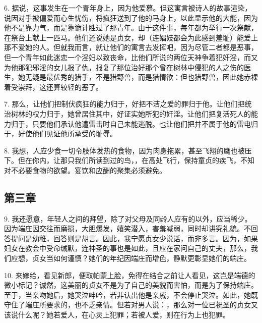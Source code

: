 6. 据说，这事发生在一个青年身上，因为他爱慕。但这寓言被诗人的故事渲染，说因对手被偏爱而心生忧伤，将疯狂送到了他的马身上，以此显示他的大能，因为他不是靠力气，而是靠诡计胜过了那青年。由于这件事，每年都为举行一次祭献，在祭台上献上一匹马。他们还说她是贞女，却（连娼妓都会为此感到羞耻）能爱上那不爱她的人。但就我而言，就让他们的寓言去发挥吧，因为尽管二者都是恶事，但一个青年如此迷恋一个淫妇以致丧命，比他们所说的两位天神争着犯奸淫，而又为他那犯邪淫的女儿报了仇，报复了那位治好那个曾在树林中侵犯的人之伤的医生，她无疑是最优秀的猎手，不是猎野兽，而是猎情欲：但也猎野兽，因此她赤裸着受崇拜，这还算较轻的恶了。\par

7. 那么，让他们把制伏疯狂的能力归于，好把不洁之爱的罪归于他。让他们把统治树林的权力归于，她曾居住其中，好证实她所犯的奸淫。让他们把复活死人的能力归于，只要他们承认他遭雷击时自己未能逃脱。也让他们把并不属于他的雷电归于，好使他们见证他所承受的耻辱。\par

8. 我想，人应少食一切令肢体发热的食物，因为肉身拖累，甚至飞翔的鹰也被压下。但在你内，让那只我们所读到过的鸟，，在高处飞行，保持童贞的疾飞，不知对不必要食物的欲望。宴饮和应酬的聚集必须避免。\par


\subsection{第三章}

\par

9. 我还愿意，年轻人之间的拜望，除了对父母及同龄人应有的以外，应当稀少。因为端庄因交往而磨损，大胆爆发，嬉笑潜入，害羞减弱，同时却讲究礼貌。不回答提问是幼稚，回答则是胡言。因此，我宁愿贞女少说话，而非多言。因为，如果妇女在教会中受命缄默，连神圣的事也是如此，且应在家问自己的丈夫，那么，我们应想，贞女当如何谨慎？她们的年纪因端庄而增色，静默更彰显她们的端庄。\par

10. 来嫁给，看见新郎，便取帕蒙上脸，免得在结合之前让人看见，这岂是端德的微小标记？诚然，这美丽的贞女不是为了自己的美貌而害怕，而是为了保持端庄。至于，当亲吻她后，她哭泣呻吟，若非认出他是亲戚，不会停止哭泣。如此，她既守住了端庄所要求的，也不乏亲情。但若对男人说：，那么对一位已祝圣的贞女又该说什么呢？她若爱人，在心灵上犯罪；若被人爱，则在行为上也犯罪。\par

